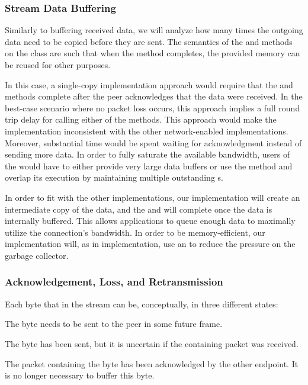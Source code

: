 \subsubsection{Stream Data Buffering}

Similarly to buffering received data, we will analyze how many times the outgoing data need to be
copied before they are sent. The semantics of the  and  methods on
the \Stream{} class are such that when the method completes, the provided memory can be reused for
other purposes.

In this case, a single-copy implementation approach would require that the  and
 methods complete after the peer acknowledges that the data were received. In the
best-case scenario where no packet loss occurs, this approach implies a full round trip delay for
calling either of the methods. This approach would make the \QuicStream{} implementation
inconsistent with the other network-enabled \Stream{} implementations. Moreover, substantial time
would be spent waiting for acknowledgment instead of sending more data. In order to fully saturate
the available bandwidth, users of the \QuicStream{} would have to either provide very large data
buffers or use the  method and overlap its execution by maintaining multiple
outstanding \ValueTask{}s.

In order to fit with the other \Stream{} implementations, our implementation will create an
intermediate copy of the data, and the  and  will complete once the
data is internally buffered. This allows applications to queue enough data to maximally utilize the
connection's bandwidth. In order to be memory-efficient, our implementation will, as in
\ReceiveStream{} implementation, use an \ArrayPoolOf{\Byte{}} to reduce the pressure on the garbage
collector.

\subsubsection{Acknowledgement, Loss, and Retransmission}

Each byte that in the stream can be, conceptually, in three different states:

\begin{itemize}

   The byte needs to be sent to the peer in some future \STREAM{} frame.

   The byte has been sent, but it is uncertain if the containing packet was
received.

   The packet containing the byte has been acknowledged by the other endpoint.
It is no longer necessary to buffer this byte.

\end{itemize}

